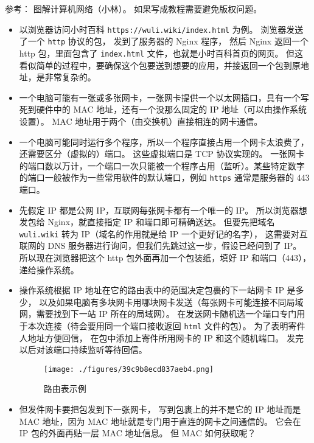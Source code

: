 
\begin{issues}
\issueDraft
\end{issues}

参考： 图解计算机网络（小林）。 如果写成教程需要避免版权问题。

\begin{itemize}
\item 以浏览器访问小时百科 \verb`https://wuli.wiki/index.html` 为例。 浏览器发送了一个 \verb`http` 协议的包， 发到了服务器的 Nginx 程序， 然后 Nginx 返回一个 http 包，里面包含了 \verb`index.html` 文件，也就是小时百科首页的网页。 但这看似简单的过程中，要确保这个包要送到想要的应用，并接返回一个包到原地址，是非常复杂的。
\item 一个电脑可能有一张或多张网卡，一张网卡提供一个以太网插口，具有一个写死到硬件中的 MAC 地址，还有一个没那么固定的 IP 地址（可以由操作系统设置）。 MAC 地址用于两个（由交换机）直接相连的网卡通信。
\item 一个电脑可能同时运行多个程序，所以一个程序直接占用一个网卡太浪费了，还需要区分（虚拟的）端口。 这些虚拟端口是 TCP 协议实现的。 一张网卡的端口数以万计，一个端口一次只能被一个程序占用（监听）。某些特定数字的端口一般被作为一些常用软件的默认端口，例如 \verb`https` 通常是服务器的 443 端口。
\item 先假定 IP 都是公网 IP，互联网每张网卡都有一个唯一的 IP。 所以浏览器想发包给 Nginx，就直接指定 IP 和端口即可精确送达。 但要先把域名 \verb`wuli.wiki` 转为 IP（域名的作用就是给 IP 一个更好记的名字）， 这需要对互联网的 DNS 服务器进行询问，但我们先跳过这一步，假设已经问到了 IP。 所以现在浏览器把这个 http 包外面再加一个包装纸，填好 IP 和端口（443），递给操作系统。
\item 操作系统根据 IP 地址在它的路由表中的范围决定包裹的下一站网卡 IP 是多少， 以及如果电脑有多块网卡用哪块网卡发送（每张网卡可能连接不同局域网，需要找到下一站 IP 所在的局域网）。 在发送网卡随机选一个端口专门用于本次连接（待会要用同一个端口接收返回 \verb`html` 文件的包）。 为了表明寄件人地址方便回信， 在包中添加上寄件所用网卡的 IP 和这个随机端口。 发完以后对该端口持续监听等待回信。
\begin{figure}[ht]
\centering
\texttt{[image: ./figures/39c9b8ecd837aeb4.png]}
\caption{路由表示例} \label{fig_NetNt_3}
\end{figure}
\item 但发件网卡要把包发到下一张网卡， 写到包裹上的并不是它的 IP 地址而是 MAC 地址，因为 MAC 地址就是专门用于直连的网卡之间通信的。 它会在 IP 包的外面再贴一层 MAC 地址信息。 但 MAC 如何获取呢？

\end{itemize}
